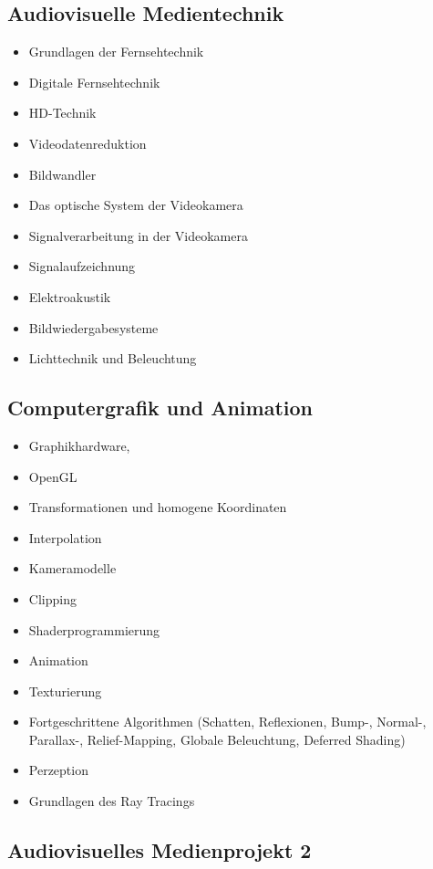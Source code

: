 \subsection*{Audiovisuelle
Medientechnik}\label{audiovisuelle-medientechnik-1}

\begin{itemize}
\tightlist
\item
  Grundlagen der Fernsehtechnik
\item
  Digitale Fernsehtechnik
\item
  HD-Technik
\item
  Videodatenreduktion
\item
  Bildwandler
\item
  Das optische System der Videokamera
\item
  Signalverarbeitung in der Videokamera
\item
  Signalaufzeichnung
\item
  Elektroakustik
\item
  Bildwiedergabesysteme
\item
  Lichttechnik und Beleuchtung
\end{itemize}

\subsection*{Computergrafik und
Animation}\label{computergrafik-und-animation-1}

\begin{itemize}
\tightlist
\item
  Graphikhardware,
\item
  OpenGL
\item
  Transformationen und homogene Koordinaten
\item
  Interpolation
\item
  Kameramodelle
\item
  Clipping
\item
  Shaderprogrammierung
\item
  Animation
\item
  Texturierung
\item
  Fortgeschrittene Algorithmen (Schatten, Reflexionen, Bump-, Normal-,
  Parallax-, Relief-Mapping, Globale Beleuchtung, Deferred Shading)
\item
  Perzeption
\item
  Grundlagen des Ray Tracings
\end{itemize}

\subsection*{Audiovisuelles Medienprojekt
2}\label{audiovisuelles-medienprojekt-2-1}

